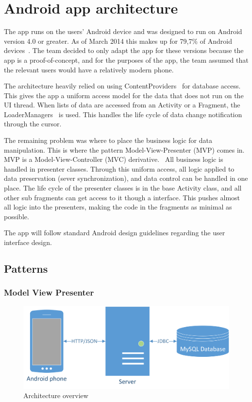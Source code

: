 

\section{Android app architecture}
The app runs on the users' Android device and was designed to run on Android version 4.0 or greater. As of March 2014 this makes up for 79,7\% of Android devices~\cite{AndroidDeviceFragmentation}. 
The team decided to only adapt the app for these versions because the app is a proof-of-concept, and for the purposes of the app, the team assumed that the relevant users would have a relatively 
modern phone. 

The architecture heavily relied on using ContentProviders~\cite{contentproviders} for database access. This gives the app a uniform access model for the data that does not run on the UI thread. 
When lists of data are accessed from an Activity or a Fragment, the LoaderManagers~\cite{loadermanager} is used. This handles the life cycle of data change notification through the cursor. 

The remaining problem was where to place the business logic for data manipulation. This is where the pattern Model-View-Presenter (MVP) comes in. 
MVP is a Model-View-Controller (MVC) derivative.~\cite{mvc} All business logic is handled in presenter classes. Through this uniform access, all logic applied to data preservation 
(sever synchronization), and data control can be handled in one place. The life cycle of the presenter classes is in the base Activity class, and all other sub fragments can get access 
to it though a interface. This pushes almost all logic into the presenters, making the code in the fragments as minimal as possible.

The app will follow standard Android design guidelines regarding the user interface design.


\subsection{Patterns}
\subsubsection{Model View Presenter}


\begin{figure}[H]
\includegraphics[width=\textwidth]{ch/architecture/fig/arch.png}
\caption{Architecture overview}
\label{fig:architecture}
\end{figure}
